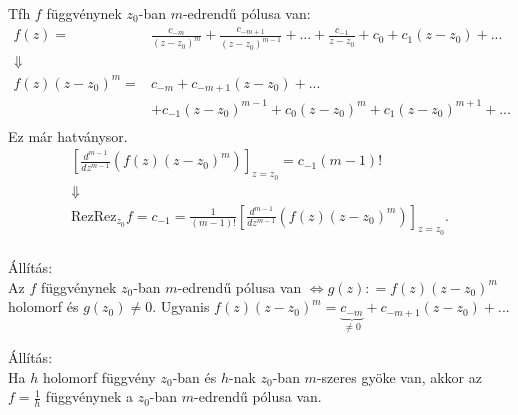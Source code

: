 \documentclass[12pt,a4paper]{scrartcl}
\newenvironment{allitas}{}{}
\begin{document}
Tfh \(f\) függvénynek \(z_{0}\)-ban \(m\)-edrendű pólusa van:
\[\begin{aligned}
  f\left( z \right) =  & \frac{{{c_{ - m}}}}{{{{\left( {z - {z_0}} \right)}^m}}} + \frac{{{c_{ - m + 1}}}}{{{{\left( {z - {z_0}} \right)}^{m - 1}}}} + ... + \frac{{{c_{ - 1}}}}{{z - {z_0}}} + {c_0} + {c_1}\left( {z - {z_0}} \right) + ... \\ 
   \Downarrow  &  \\ 
  f\left( z \right){\left( {z - {z_0}} \right)^m} =  & {c_{ - m}} + {c_{ - m + 1}}\left( {z - {z_0}} \right) + ... \\ 
   &  + {c_{ - 1}}{\left( {z - {z_0}} \right)^{m - 1}} + {c_0}{\left( {z - {z_0}} \right)^m} + {c_1}{\left( {z - {z_0}} \right)^{m + 1}} + ... \\ 
\end{aligned} \] Ez már hatványsor. \[\begin{gathered}
  {\left[ {\frac{{{d^{m - 1}}}}{{d{z^{m - 1}}}}\left( {f\left( z \right){{\left( {z - {z_0}} \right)}^m}} \right)} \right]_{z = {z_0}}} = {c_{ - 1}}\left( {m - 1} \right)! \\ 
   \Downarrow  \\ 
  {\text{Rez}}
  {{\text{Rez}}_{{z_0}}}f = {c_{ - 1}} = \frac{1}{{\left( {m - 1} \right)!}}{\left[ {\frac{{{d^{m - 1}}}}{{d{z^{m - 1}}}}\left( {f\left( z \right){{\left( {z - {z_0}} \right)}^m}} \right)} \right]_{z = {z_0}}} .\\ 
\end{gathered} \]

\begin{allitas}

Állítás:\\
Az \(f\) függvénynek \(z_{0}\)-ban \(m\)-edrendű pólusa van
\(\left. \Leftrightarrow g\left( z \right): = f\left( z \right)\left( {z - z_{0}} \right)^{m} \right.\)
holomorf és \(g\left( z_{0} \right) \neq 0\). Ugyanis
\(f\left( z \right){\left( {z - {z_0}} \right)^m} = \underbrace {{c_{ - m}}}_{ \ne 0} + {c_{ - m + 1}}\left( {z - {z_0}} \right) + ...\)

\end{allitas}

\begin{allitas}

Állítás:\\
Ha \(h\) holomorf függvény \(z_{0}\)-ban és \(h\)-nak \(z_{0}\)-ban
\(m\)-szeres gyöke van, akkor az \(f = \frac{1}{h}\) függvénynek a
\(z_{0}\)-ban \(m\)-edrendű pólusa van.

\end{allitas}
\end{document}
